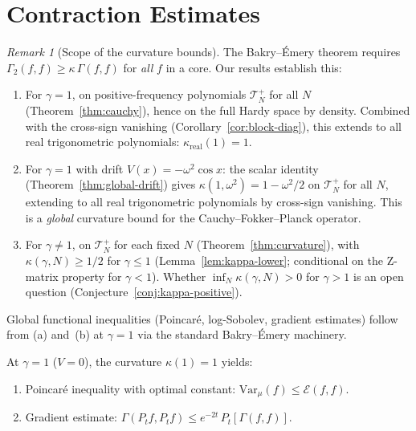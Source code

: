 \documentclass[11pt,a4paper]{article}
\theoremstyle{plain}
\theoremstyle{definition}
\theoremstyle{remark}
\newtheorem{remark}[theorem]{Remark}
\newcommand{\Var}{\mathrm{Var}}
\begin{document}
\section{Contraction Estimates}\label{sec:func-ineq}

\begin{remark}[Scope of the curvature bounds]
\label{rem:scope-curv}
The Bakry--\'Emery theorem requires
$\Gamma_2(f,f) \geq \kappa\,\Gamma(f,f)$ for \emph{all}
$f$ in a core.  Our results establish this:
\begin{enumerate}[label=(\alph*)]
\item For $\gamma = 1$, on positive-frequency polynomials
  $\mathcal{T}_N^+$ for all $N$ (Theorem~\ref{thm:cauchy}),
  hence on the full Hardy space by density.
  Combined with the cross-sign vanishing
  (Corollary~\ref{cor:block-diag}), this extends to
  all real trigonometric polynomials:
  $\kappa_{\mathrm{real}}(1) = 1$.
\item For $\gamma = 1$ with drift $V(x) = -\omega^2\cos x$:
  the scalar identity (Theorem~\ref{thm:global-drift}) gives
  $\kappa(1,\omega^2) = 1 - \omega^2/2$ on $\mathcal{T}_N^+$
  for all $N$, extending to all real trigonometric polynomials
  by cross-sign vanishing.  This is a \emph{global} curvature
  bound for the Cauchy--Fokker--Planck operator.
\item For $\gamma \neq 1$, on $\mathcal{T}_N^+$ for
  each fixed $N$ (Theorem~\ref{thm:curvature}), with
  $\kappa(\gamma,N) \geq 1/2$ for $\gamma \leq 1$
  (Lemma~\ref{lem:kappa-lower}; conditional on the Z-matrix
  property for $\gamma < 1$).
  Whether $\inf_N \kappa(\gamma,N) > 0$ for $\gamma > 1$
  is an open question (Conjecture~\ref{conj:kappa-positive}).
\end{enumerate}
Global functional inequalities (Poincar\'e, log-Sobolev,
gradient estimates) follow from (a) and~(b) at $\gamma = 1$
via the standard Bakry--\'Emery machinery.
\end{remark}

At $\gamma = 1$ ($V = 0$), the curvature $\kappa(1) = 1$
yields:
\begin{enumerate}[label=(\roman*)]
\item Poincar\'e inequality with optimal constant:
  $\Var_\mu(f) \leq \mathcal{E}(f,f)$.
\item Gradient estimate:
  $\Gamma(P_t f, P_t f) \leq e^{-2t}\,P_t[\Gamma(f,f)]$.
\end{enumerate}
\end{document}
